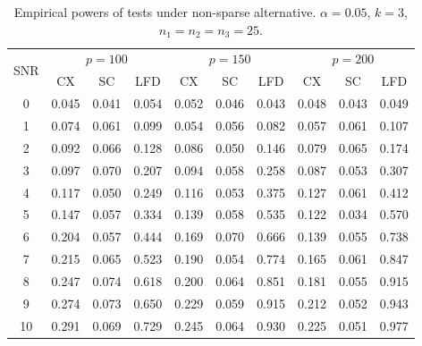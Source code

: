 \documentclass[12pt]{article} %
\theoremstyle{definition}
\begin{document}
\begin{table}[!hbp]
    \caption{Empirical powers of tests under non-sparse alternative. $\alpha=0.05$, $k=3$, $n_1=n_2=n_3=25$. }
    \label{table2}
\centering
\begin{tabular}{*{10}{c}}
\toprule
\multirow{2}{*}{SNR} &\multicolumn{3}{c}{$p=100$}&\multicolumn{3}{c}{$p=150$}&\multicolumn{3}{c}{$p=200$} \\
    \cmidrule(r){2-4}\cmidrule(r){5-7}\cmidrule(r){8-10}
        & CX & SC & LFD & CX &SC &LFD &CX & SC & LFD\\
\midrule
0 & 0.045 & 0.041 & 0.054 & 0.052 & 0.046 & 0.043 & 0.048 & 0.043 & 0.049 \\ 
1 & 0.074 & 0.061 & 0.099 & 0.054 & 0.056 & 0.082 & 0.057 & 0.061 & 0.107 \\ 
2 & 0.092 & 0.066 & 0.128 & 0.086 & 0.050 & 0.146 & 0.079 & 0.065 & 0.174 \\ 
3 & 0.097 & 0.070 & 0.207 & 0.094 & 0.058 & 0.258 & 0.087 & 0.053 & 0.307 \\ 
4 & 0.117 & 0.050 & 0.249 & 0.116 & 0.053 & 0.375 & 0.127 & 0.061 & 0.412 \\ 
5 & 0.147 & 0.057 & 0.334 & 0.139 & 0.058 & 0.535 & 0.122 & 0.034 & 0.570 \\ 
6 & 0.204 & 0.057 & 0.444 & 0.169 & 0.070 & 0.666 & 0.139 & 0.055 & 0.738 \\ 
7 & 0.215 & 0.065 & 0.523 & 0.190 & 0.054 & 0.774 & 0.165 & 0.061 & 0.847 \\ 
8 & 0.247 & 0.074 & 0.618 & 0.200 & 0.064 & 0.851 & 0.181 & 0.055 & 0.915 \\ 
9 & 0.274 & 0.073 & 0.650 & 0.229 & 0.059 & 0.915 & 0.212 & 0.052 & 0.943 \\ 
10 & 0.291 & 0.069 & 0.729 & 0.245 & 0.064 & 0.930 & 0.225 & 0.051 & 0.977 \\ 
                                                        \hline
\bottomrule
\end{tabular}
\end{table}
\end{document}
